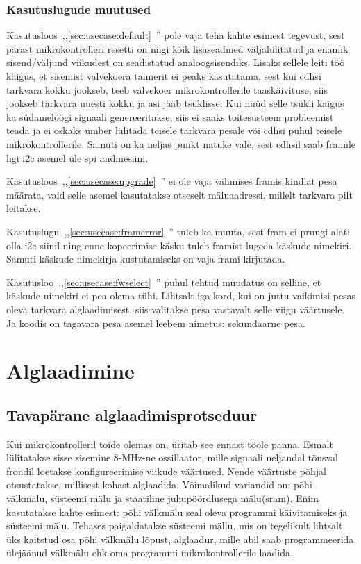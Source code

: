 \documentclass[12pt,a4paper]{article}
\begin{document}
\subsubsection{Kasutuslugude muutused}
Kasutusloos~,,\ref{sec:usecase:default}~'' pole
vaja teha kahte esimest tegevust, sest pärast mikrokontrolleri resetti on niigi
kõik lisaseadmed väljalülitatud ja enamik sisend/väljund viikudest on
seadistatud analoogsisendiks\cite{f1rm,f2rm}. Lisaks sellele leiti töö käigus,
et sisemist valvekoera taimerit ei peaks kasutatama, sest kui \gls{cdhs}i
tarkvara kokku jookseb, teeb valvekoer mikrokontrollerile taaskäivituse, siis
jookseb tarkvara uuesti kokku ja asi jääb tsüklisse. Kui nüüd selle tsükli
käigus ka südamelöögi signaali genereeritakse, siis ei saaks toitesüsteem
probleemist teada ja ei oskaks ümber lülitada teisele tarkvara pesale või
\gls{cdhs}i puhul teisele mikrokontrollerile. Samuti on ka neljas punkt natuke
vale, sest \gls{cdhs}il saab \gls{fram}ile ligi \gls{i2c} asemel üle \gls{spi}
andmesiini.

Kasutusloos~,,\ref{sec:usecase:upgrade}~'' ei ole
vaja välimises \gls{fram}is kindlat pesa määrata, vaid selle asemel kasutatakse
otseselt mäluaadressi, millelt tarkvara pilt leitakse.

Kasutuslugu~,,\ref{sec:usecase:framerror}~''
tuleb ka muuta, sest \gls{fram} ei pruugi alati olla \gls{i2c} siinil ning enne
kopeerimise käsku tuleb \gls{fram}ist lugeda käskude nimekiri. Samuti käskude
nimekirja kustutamiseks on vaja \gls{fram}i kirjutada.

Kasutusloo~,,\ref{sec:usecase:fwselect}~'' puhul
tehtud muudatus on selline, et käskude nimekiri ei pea olema tühi. Lihtsalt iga
kord, kui on juttu vaikimisi pesas oleva tarkvara alglaadimisest, siis valitakse
pesa vastavalt selle viigu väärtusele. Ja koodis on tagavara pesa asemel leebem
nimetus: sekundaarne pesa.

\section{Alglaadimine}
\label{sec:boot}
\subsection{Tavapärane alglaadimisprotseduur}
\label{sec:boot:tava}
Kui mikrokontrolleril toide olemas on, üritab see ennast tööle panna. Esmalt
lülitatakse sisse sisemine 8-MHz-ne ossillaator, mille signaali neljandal
tõusval frondil loetakse konfigureerimise viikude väärtused. Nende väärtuste
põhjal otsustatakse, millisest kohast alglaadida. Võimalikud variandid on: põhi
välkmälu, süsteemi mälu ja staatiline juhupöördlusega mälu(\gls{sram}). Enim
kasutatakse kahte esimest: põhi välkmälu seal oleva programmi käivitamiseks ja
süsteemi mälu. Tehases paigaldatakse süsteemi mällu, mis on tegelikult lihtsalt
üks kaitstud osa põhi välkmälu lõpust, alglaadur, mille abil saab programmeerida
ülejäänud välkmälu ehk oma programmi mikrokontrollerile laadida.
\end{document}
